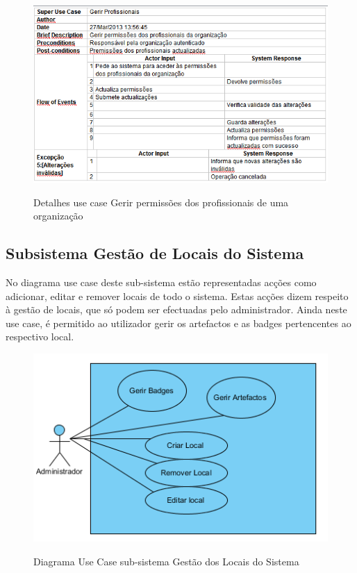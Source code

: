 ﻿\documentclass[12pt,a4paper]{article}
\begin{document}
\begin{figure}[h!]
\centering
\includegraphics[scale=0.7]{d_usecase/P_permissoes}
\label{usecase}
\caption{Detalhes use case Gerir permissões dos profissionais de uma organização}
\end{figure}

\clearpage

\subsection{Subsistema Gestão de Locais do Sistema}
No diagrama use case deste sub-sistema estão representadas acções como adicionar, editar e remover locais de todo o sistema. Estas acções dizem respeito à gestão de locais, que só podem ser efectuadas pelo administrador. Ainda neste use case, é permitido ao utilizador gerir os artefactos e as badges pertencentes ao respectivo local.\\

\begin{figure}[h!]
\centering
\includegraphics[scale=1]{usecase/A_GerirLocal}
\label{usecase}
\caption{Diagrama Use Case sub-sistema Gestão dos Locais do Sistema}
\end{figure}
\end{document}
